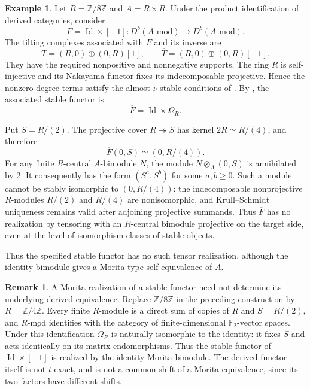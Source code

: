 \documentclass[12pt,a4paper,english,reqno]{amsart}
\numberwithin{equation}{section}
\theoremstyle{plain}
\theoremstyle{definition}
\newtheorem{example}[theorem]{Example}
\newtheorem{remark}[theorem]{Remark}
\begin{document}
\begin{example}
\label{ex:rigidity-almost-nu-z8}
Let $R=\mathbb Z/8\mathbb Z$ and $A=R\times R$.  Under the product
identification of derived categories, consider
\[
 F=\operatorname{Id}\times[-1]:D^b(A\text{-}\mathrm{mod})
                          \longrightarrow D^b(A\text{-}\mathrm{mod}).
\]
The tilting complexes associated with $F$ and its inverse are
\[
 T=(R,0)\oplus(0,R)[1],\qquad
 \overline T=(R,0)\oplus(0,R)[-1].
\]
They have the required nonpositive and nonnegative supports.
The ring $R$ is self-injective and its Nakayama functor fixes its
indecomposable projective.  Hence the nonzero-degree terms satisfy
the almost $\nu$-stable conditions of \cite{HuXi2010}.
By \cite[Example~4.7(b)]{HuPan2017}, the associated stable functor is
\[
 \overline F=\operatorname{Id}\times\Omega_R.
\]

Put $S=R/(2)$.  The projective cover $R\twoheadrightarrow S$ has
kernel $2R\simeq R/(4)$, and therefore
\[
 \overline F(0,S)\simeq(0,R/(4)).
\]
For any finite $R$-central $A$-bimodule $N$, the module
$N\otimes_A(0,S)$ is annihilated by $2$.  It consequently has the
form $(S^a,S^b)$ for some $a,b\geq0$.  Such a module cannot be
stably isomorphic to $(0,R/(4))$: the indecomposable nonprojective
$R$-modules $R/(2)$ and $R/(4)$ are nonisomorphic, and
Krull--Schmidt uniqueness remains valid after adjoining projective
summands.  Thus $\overline F$ has no realization by tensoring with
an $R$-central bimodule projective on the target side, even at the
level of isomorphism classes of stable objects.

Thus the specified stable functor has no such tensor realization,
although the identity bimodule gives a Morita-type self-equivalence
of $A$.
\end{example}

\begin{remark}
A Morita realization of a stable functor need not determine its
underlying derived equivalence.  Replace $\mathbb Z/8\mathbb Z$ in the preceding construction by
$R=\mathbb Z/4\mathbb Z$.  Every finite $R$-module is a direct sum
of copies of $R$ and $S=R/(2)$, and
$R\text{-}\underline{\mathrm{mod}}$ identifies with the category
of finite-dimensional $\mathbb F_2$-vector spaces.  Under this
identification $\Omega_R$ is naturally isomorphic to the identity:
it fixes $S$ and acts identically on its matrix endomorphisms.
Thus the stable functor of $\operatorname{Id}\times[-1]$ is
realized by the identity Morita bimodule.  The derived functor
itself is not $t$-exact, and is not a common shift of a Morita
equivalence, since its two factors have different shifts.
\end{remark}
\end{document}
